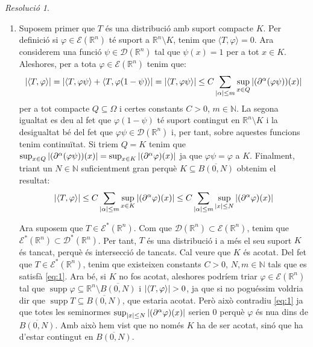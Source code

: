 \documentclass[10pt,a4paper]{article}
\newcommand{\NN}{\ensuremath{\mathbb{N}}} %
\newcommand{\RR}{\ensuremath{\mathbb{R}}} %
\DeclareMathOperator{\supp}{\mathrm{supp}} %
\theoremstyle{definition}
\theoremstyle{remark}
\newtheorem*{res}{Resolució}
\begin{document}
\begin{res}\hfill
  \begin{enumerate}
    \item Suposem primer que $T$ és una distribució amb suport compacte $K$. Per definició si $\varphi\in \mathcal{E}(\RR^n)$ té suport a $\RR^n\setminus K$, tenim que $\langle T,\varphi\rangle =0$. Ara considerem una funció $\psi\in \mathcal{D}(\RR^n)$ tal que $\psi(x)=1$ per a tot $x\in K$. Aleshores, per a tota $\varphi\in \mathcal{E}(\RR^n)$ tenim que:
          $$
            \abs{\langle T,\varphi\rangle} = \abs{\langle T,\varphi\psi\rangle + \langle T,\varphi(1-\psi)\rangle} = \abs{\langle T,\varphi\psi\rangle}\leq C \sum_{\abs{\alpha}\leq m}\sup_{x\in Q}\abs{(\partial^\alpha(\varphi\psi))(x)}
          $$
          per a tot compacte $Q\subseteq \Omega$ i certes constants $C>0$, $m\in\NN$. La segona igualtat es deu al fet que $\varphi(1-\psi)$ té suport contingut en $\RR^n\setminus K$ i la desigualtat bé del fet que $\varphi\psi\in\mathcal{D}(\RR^n)$ i, per tant, sobre aquestes funcions tenim continuïtat. Si triem $Q=K$ tenim que $\sup_{x\in Q}\abs{(\partial^\alpha(\varphi\psi))(x)}= \sup_{x\in K}\abs{(\partial^\alpha\varphi)(x)}$ ja que $\varphi\psi=\varphi$ a $K$. Finalment, triant un $N\in\NN$ suficientment gran perquè $K\subseteq \overline{B(0,N)}$ obtenim el resultat: $$\abs{\langle T,\varphi\rangle}\leq C\sum_{\abs{\alpha}\leq m} \sup_{x\in K}\abs{(\partial^\alpha\varphi)(x)}\leq C\sum_{\abs{\alpha}\leq m}\sup_{\abs{x}\leq N}\abs{(\partial^\alpha\varphi)(x)}$$


          Ara suposem que $T\in \mathcal{E}^*(\RR^n)$. Com que $\mathcal{D}(\RR^n)\subset \mathcal{E}(\RR^n)$, tenim que $\mathcal{E}^*(\RR^n)\subset \mathcal{D}^*(\RR^n)$. Per tant, $T$ és una distribució i a més el seu suport $K$ és tancat, perquè és intersecció de tancats. Cal veure que $K$ és acotat. Del fet que $T\in\mathcal{E}^*(\RR^n)$, tenim que existeixen constants $C>0$, $N,m\in\NN$ tals que es satisfà \eqref{eq:1}. Ara bé, si $K$ no fos acotat, aleshores podríem triar $\varphi\in \mathcal{E}(\RR^n)$ tal que $\supp \varphi \subseteq \RR^n\setminus \overline{B(0, N)}$ i $\abs{\langle T,\varphi\rangle}>0$, ja que si no poguéssim voldria dir que $\supp T\subseteq \overline{B(0, N)}$, que estaria acotat. Però això contradiu \eqref{eq:1} ja que totes les seminormes $\sup_{\abs{x}\leq N}\abs{(\partial^\alpha\varphi)(x)}$ serien 0 perquè $\varphi$ és nu\lgem a dins de $\overline{B(0, N)}$. Amb això hem vist que no només $K$ ha de ser acotat, sinó que ha d'estar contingut en $\overline{B(0,N)}$.


\end{enumerate}
\end{res}
\end{document}
